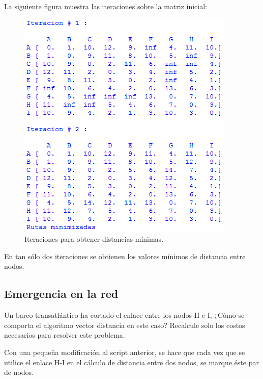 \documentclass{article}
\begin{document}
La siguiente figura muestra las iteraciones sobre la matriz inicial:
\begin{figure}[H]
    \centering
    \includegraphics[scale=0.7]{rutas}
    \caption{Iteraciones para obtener distancias mínimas.}
\end{figure}
    
En tan sólo dos iteraciones se obtienen los valores mínimos de distancia entre nodos.


\subsection{Emergencia en la red}
Un barco transatlántico ha cortado el enlace entre los nodos H e I, ¿Cómo se comporta el algoritmo vector distancia en este caso? Recalcule solo los costos necesarios para resolver este problema.

Con una pequeña modificación al script anterior, se hace que cada vez que se utilice el enlace H-I en el cálculo de distancia entre dos nodos, se marque éste par de nodos.
\end{document}
